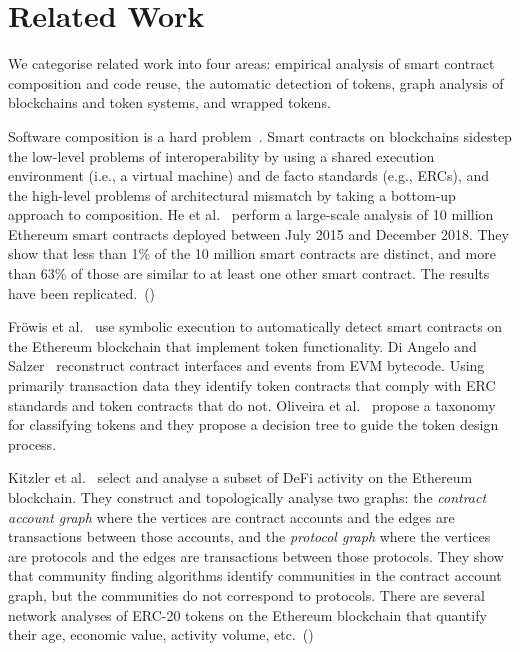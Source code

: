 \section{Related Work}\label{sec:related-work}

We categorise related work into four areas: empirical analysis of
smart contract composition and code reuse, the automatic detection of
tokens, graph analysis of blockchains and token systems, and wrapped
tokens.

Software composition is a hard problem~\cite{garlan-et-al-94}.  Smart
contracts on blockchains sidestep the low-level problems of
interoperability by using a shared execution environment (i.e., a
virtual machine) and de facto standards (e.g., ERCs), and the
high-level problems of architectural mismatch by taking a bottom-up
approach to composition.  He et al.~\cite{he-et-al-20} perform a
large-scale analysis of \num{10} million Ethereum smart contracts
deployed between July 2015 and December 2018.  They show that less
than \num{1}\% of the \num{10} million smart contracts are distinct,
and more than \num{63}\% of those are similar to at least one other
smart contract.  The results have been
replicated.~(\cite{kondo-et-al-20,chen-et-al-21,khan-et-al-22})

Fr\"owis et al.~\cite{frowis-et-al-19} use symbolic execution to
automatically detect smart contracts on the Ethereum blockchain that
implement token functionality.  Di Angelo and
Salzer~\cite{di-angelo-salzer-21} reconstruct contract interfaces and
events from EVM bytecode.  Using primarily transaction data they
identify token contracts that comply with ERC standards and token
contracts that do not.  Oliveira et al.~\cite{oliveira-et-al-18}
propose a taxonomy for classifying tokens and they propose a decision
tree to guide the token design process.

Kitzler et al.~\cite{kitzler-et-al-21} select and analyse a subset of
DeFi activity on the Ethereum blockchain.  They construct and
topologically analyse two graphs: the \textit{contract account graph}
where the vertices are contract accounts and the edges are
transactions between those accounts, and the \textit{protocol graph}
where the vertices are protocols and the edges are transactions
between those protocols.  They show that community finding algorithms
identify communities in the contract account graph, but the
communities do not correspond to protocols.  There are several network
analyses of ERC-20 tokens on the Ethereum blockchain that quantify
their age, economic value, activity volume,
etc.~(\cite{somin-et-al-18,victor-luders-19})

